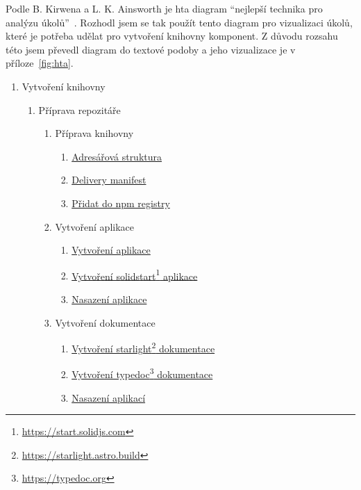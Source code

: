 Podle B. Kirwena a L. K. Ainsworth je \gls{hta} diagram ``nejlepší technika pro analýzu úkolů''~\cite{kirwan1992}.
Rozhodl jsem se tak použít tento diagram pro vizualizaci úkolů, které je potřeba udělat pro vytvoření knihovny komponent.
Z důvodu rozsahu této jsem převedl diagram do textové podoby a jeho vizualizace je v příloze~\ref{fig:hta}.

\begin{enumerate}[label=\arabic*.]
    \item Vytvoření knihovny
          \begin{enumerate}[label*=\arabic*.]
              \item Příprava repozitáře
                    \begin{enumerate}[label*=\arabic*.]
                        \item Příprava knihovny
                              \begin{enumerate}[label*=\arabic*.]
                                  \item \ul{Adresářová struktura}
                                  \item \ul{Delivery manifest}
                                  \item \ul{Přidat do npm registry}
                              \end{enumerate}
                        \item Vytvoření aplikace
                              \begin{enumerate}[label*=\arabic*.]
                                  \item \ul{Vytvoření aplikace}
                                  \item \ul{Vytvoření solidstart\footnote{\url{https://start.solidjs.com}} aplikace}
                                  \item \ul{Nasazení aplikace}
                              \end{enumerate}
                        \item Vytvoření dokumentace
                              \begin{enumerate}[label*=\arabic*.]
                                  \item \ul{Vytvoření starlight\footnote{\url{https://starlight.astro.build}} dokumentace}
                                  \item \ul{Vytvoření typedoc\footnote{\url{https://typedoc.org}} dokumentace}
                                  \item \ul{Nasazení aplikací}

\end{enumerate}
\end{enumerate}
\end{enumerate}
\end{enumerate}
